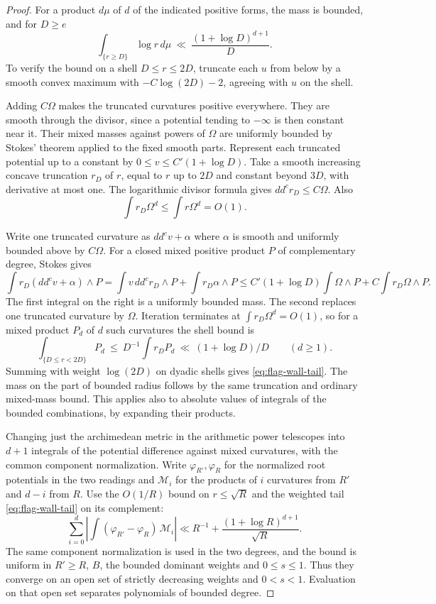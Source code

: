 \begin{proof}
For a product \(d\mu\) of \(d\) of the indicated positive forms,
the mass is bounded, and for \(D\ge e\)
\begin{equation}\label{eq:flag-wall-tail}
 \int_{\{r\ge D\}}\log r\,d\mu
       \ \ll\ \frac{(1+\log D)^{d+1}}{D}.
\end{equation}
To verify the bound on a shell \(D\le r\le 2D\), truncate
each \(u\) from below by a smooth convex maximum with
\(-C\log(2D)-2\), agreeing with \(u\) on the shell.

Adding
\(C\Omega\) makes the truncated curvatures positive everywhere.
They are smooth through the divisor, since a potential tending
to \(-\infty\) is then constant near it. Their mixed masses
against powers of \(\Omega\) are uniformly bounded by Stokes'
theorem applied to the fixed smooth parts. Represent each
truncated potential up to a constant by
\(0\le v\le C'(1+\log D)\). Take a smooth increasing concave
truncation \(r_D\) of \(r\), equal to \(r\) up to \(2D\) and
constant beyond \(3D\), with derivative at most one.
The logarithmic divisor formula gives \(dd^c r_D\le C\Omega\).
Also
\[
 \int r_D\Omega^d\le\int r\Omega^d=O(1).
\]

Write one truncated curvature as \(dd^c v+\alpha\) where
\(\alpha\) is smooth and uniformly bounded above by \(C\Omega\).
For a closed mixed positive product \(P\) of complementary
degree, Stokes gives
\[
 \int r_D(dd^c v+\alpha)\wedge P
   =\int v\,dd^c r_D\wedge P+\int r_D\alpha\wedge P
   \le C'(1+\log D)\int\Omega\wedge P+
                              C\int r_D\Omega\wedge P.
\]
The first integral on the right is a uniformly bounded mass.
The second replaces one truncated curvature by \(\Omega\).
Iteration terminates at \(\int r_D\Omega^d=O(1)\), so for a mixed
product \(P_d\) of \(d\) such curvatures the shell bound is
\[
 \int_{\{D\le r<2D\}}P_d
  \ \le\ D^{-1}\int r_D P_d
  \ \ll\ (1+\log D)/D \qquad (d\ge1).
\]
Summing with weight \(\log(2D)\) on dyadic shells gives
\eqref{eq:flag-wall-tail}.
The mass on the part of bounded radius follows by the same
truncation and ordinary mixed-mass bound. This applies also
to absolute values of integrals of the bounded combinations,
by expanding their products. \label{cor:flag-wall-polynomial-4}

Changing just the archimedean metric in the arithmetic power
telescopes into \(d+1\) integrals of the potential difference
against mixed curvatures, with the common component
normalization. Write \(\varphi_{R'},\varphi_R\) for the normalized root
potentials in the two readings and \(\mathcal M_i\) for the products
of \(i\) curvatures from \(R'\) and \(d-i\) from \(R\).
Use the \(O(1/R)\) bound on \(r\le\sqrt R\) and the weighted
tail \eqref{eq:flag-wall-tail} on its complement:
\[
 \sum_{i=0}^d\left|\int (\varphi_{R'}-\varphi_R)\,\mathcal M_i\right|
   \ll R^{-1}+\frac{(1+\log R)^{d+1}}{\sqrt R}.
\]
The same component normalization is used in the two degrees,
and the bound is uniform in \(R'\ge R\), \(B\), the bounded
dominant weights and \(0\le s\le1\). Thus they converge on an
open set of strictly decreasing weights and \(0<s<1\).
Evaluation on that open set separates polynomials of bounded
degree.


\end{proof}
